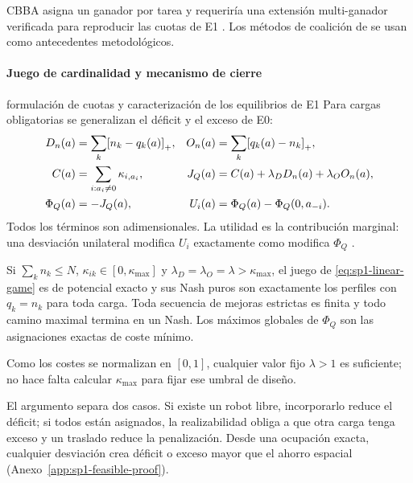 CBBA asigna un ganador por tarea y requeriría una extensión multi-ganador verificada para reproducir las cuotas de E1 \parencite{choiBrunetHow2009CBBA}. Los métodos de coalición de \textcite{shehoryKraus1998Coalition,vigAdams2006Coalition} se usan como antecedentes metodológicos.

\paragraph{Juego de cardinalidad y mecanismo de cierre}

\begin{contribucion}{formulación de cuotas y caracterización de los equilibrios de E1}
Para cargas obligatorias se generalizan el déficit y el exceso de E0:
\begin{equation}
\begin{aligned}
 D_n(a)&=\sum_k\mathopen{\textnormal{[}}n_k-q_k(a)\mathclose{\textnormal{]}}_{+}, &
 O_n(a)&=\sum_k\mathopen{\textnormal{[}}q_k(a)-n_k\mathclose{\textnormal{]}}_{+},\\
 C(a)&=\sum_{i:a_i\neq0}\kappa_{i,a_i}, &
 J_Q(a)&=C(a)+\lambda_DD_n(a)+\lambda_OO_n(a),\\
 \Phi_Q(a)&=-J_Q(a), &
 U_i(a)&=\Phi_Q(a)-\Phi_Q(0,a_{-i}).
\end{aligned}
\label{eq:sp1-linear-game}
\end{equation}
Todos los términos son adimensionales. La utilidad es la contribución marginal: una desviación unilateral modifica $U_i$ exactamente como modifica $\Phi_Q$ \parencite{monderer1996potential}.

\begin{proposicion}
\label{thm:sp1-feasible-nash}
Si $\sum_kn_k\leq N$, $\kappa_{ik}\in[0,\kappa_{\max}]$ y $\lambda_D=\lambda_O=\lambda>\kappa_{\max}$, el juego de \eqref{eq:sp1-linear-game} es de potencial exacto y sus Nash puros son exactamente los perfiles con $q_k=n_k$ para toda carga. Toda secuencia de mejoras estrictas es finita y todo camino maximal termina en un Nash. Los máximos globales de $\Phi_Q$ son las asignaciones exactas de coste mínimo.
\end{proposicion}
Como los costes se normalizan en $[0,1]$, cualquier valor fijo $\lambda>1$ es suficiente; no hace falta calcular $\kappa_{\max}$ para fijar ese umbral de diseño.
\end{contribucion}
El argumento separa dos casos. Si existe un robot libre, incorporarlo reduce el déficit; si todos están asignados, la realizabilidad obliga a que otra carga tenga exceso y un traslado reduce la penalización. Desde una ocupación exacta, cualquier desviación crea déficit o exceso mayor que el ahorro espacial (Anexo~\ref{app:sp1-feasible-proof}).

